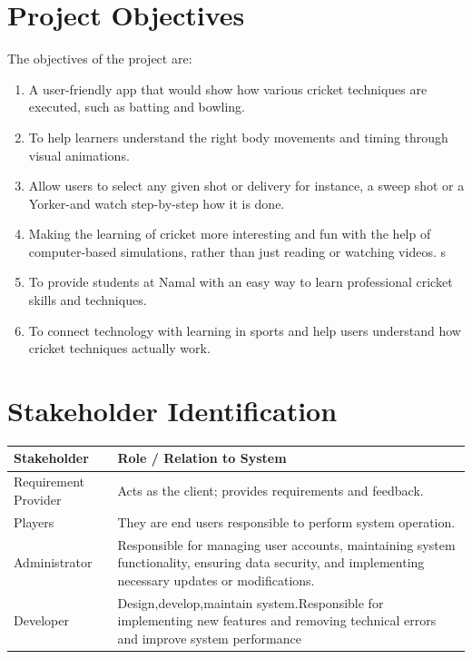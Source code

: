 \documentclass[12pt,a4paper]{article}
\begin{document}
\section{Project Objectives}
The objectives of the project are:
\begin{enumerate}[label=\arabic*.]
    \item A user-friendly app that would show how various cricket techniques are executed, such as batting and bowling.


    \item To help learners understand the right body movements and timing through visual animations.


    \item Allow users to select any given shot or delivery for instance, a sweep shot or a Yorker-and watch step-by-step how it is done.


    \item Making the learning of cricket more interesting and fun with the help of computer-based simulations, rather than just reading or watching videos.
s
    
    \item To provide students at Namal with an easy way to learn professional cricket skills and techniques.

    
    \item To connect technology with learning in sports and help users understand how cricket techniques actually work.
\end{enumerate}

\section{Stakeholder Identification}
\begin{longtable}{|p{4cm}|p{10cm}|}
\hline
\textbf{Stakeholder} & \textbf{Role / Relation to System} \\ \hline
Requirement Provider & Acts as the client; provides requirements and feedback. \\ \hline
Players & They are end users responsible to perform system operation. \\ \hline
Administrator & Responsible for managing user accounts, maintaining system functionality, ensuring data security, and implementing necessary updates or modifications.\\ \hline
\hline
Developer & Design,develop,maintain system.Responsible for implementing new features and removing technical errors and improve system performance\\ \hline
\end{longtable}
\end{document}
